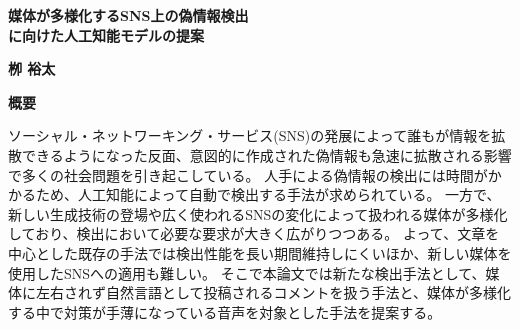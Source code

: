 



\thispagestyle{plain}
\cleardoublepage
%
%

\begin{center}
    \Large
    \textbf{媒体が多様化するSNS上の偽情報検出\\に向けた人工知能モデルの提案}
        
    \vspace{0.4cm}
    \textbf{栁 裕太}
       
    \vspace{0.9cm}
    \textbf{概要}
   
\end{center}

ソーシャル・ネットワーキング・サービス(SNS)の発展によって誰もが情報を拡散できるようになった反面、意図的に作成された偽情報も急速に拡散される影響で多くの社会問題を引き起こしている。
人手による偽情報の検出には時間がかかるため、人工知能によって自動で検出する手法が求められている。
一方で、新しい生成技術の登場や広く使われるSNSの変化によって扱われる媒体が多様化しており、検出において必要な要求が大きく広がりつつある。
よって、文章を中心とした既存の手法では検出性能を長い期間維持しにくいほか、新しい媒体を使用したSNSへの適用も難しい。
そこで本論文では新たな検出手法として、媒体に左右されず自然言語として投稿されるコメントを扱う手法と、媒体が多様化する中で対策が手薄になっている音声を対象とした手法を提案する。

